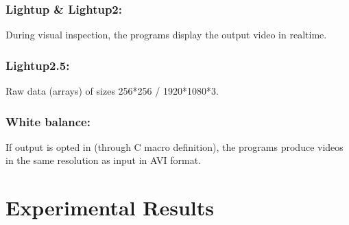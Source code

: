 \documentclass{acm_proc_article-sp}
\begin{document}
\subsubsection{Lightup \& Lightup2:}
During visual inspection, the programs display the output video in realtime.
\subsubsection{Lightup2.5:}
Raw data (arrays) of sizes 256*256 / 1920*1080*3.
\subsubsection{White balance:}
If output is opted in (through C macro definition), the programs produce videos in the same resolution as input in AVI format. 

\section{Experimental Results}
\end{document}
